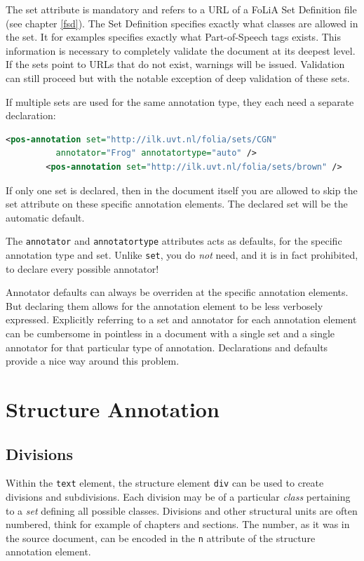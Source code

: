\documentclass[a4paper,12pt]{report}
\begin{document}
The set attribute is mandatory and refers to a URL of a FoLiA Set Definition file (see chapter \ref{fsd}). The Set Definition specifies exactly what classes are allowed in the set. It for examples specifies exactly what Part-of-Speech tags exists. This information is necessary to completely validate the document at its deepest level. If the sets point to URLs that do not exist, warnings will be issued. Validation can still proceed but with the notable exception of deep validation of these sets.

If multiple sets are used for the same annotation type, they each need a separate declaration:

\begin{lstlisting}[language=xml]
        <pos-annotation set="http://ilk.uvt.nl/folia/sets/CGN" 
          annotator="Frog" annotatortype="auto" />
        <pos-annotation set="http://ilk.uvt.nl/folia/sets/brown" />
\end{lstlisting}

If only one set is declared, then in the document itself you are allowed to skip the set attribute on these specific annotation elements. The declared set will be the automatic default. 

The \texttt{annotator} and \texttt{annotatortype} attributes acts as defaults, for the specific annotation type and set. Unlike \texttt{set}, you do \emph{not} need, and it is in fact prohibited, to declare every possible annotator!

Annotator defaults can always be overriden at the specific annotation elements. But declaring them allows for the annotation element to be less verbosely expressed. Explicitly referring to a set and annotator for each annotation element can be cumbersome in pointless in a document with a single set and a single annotator for that particular type of annotation. Declarations and defaults provide a nice way around this problem.


\section{Structure Annotation}

\subsection{Divisions}

Within the \texttt{text} element, the structure element \texttt{div} can be used to create divisions and subdivisions. Each division may be of a particular \emph{class} pertaining to a \emph{set} defining all possible classes. Divisions and other structural units are often numbered, think for example of chapters and sections. The number, as it was in the source document, can be encoded in the \texttt{n} attribute of the structure annotation element.
\end{document}
